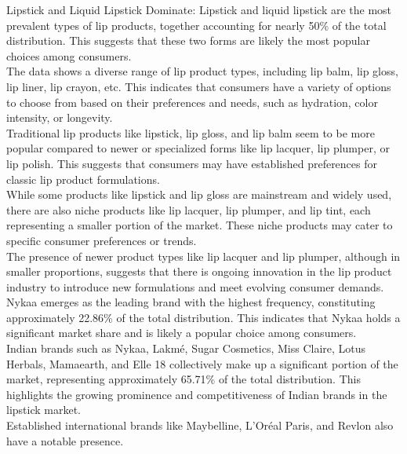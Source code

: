 \documentclass{article}
\begin{document}
\noindent Lipstick and Liquid Lipstick Dominate: Lipstick and liquid lipstick are the most prevalent types of lip products, together accounting for nearly 50\% of the total distribution. This suggests that these two forms are likely the most popular choices among consumers.\\

\noindent The data shows a diverse range of lip product types, including lip balm, lip gloss, lip liner, lip crayon, etc. This indicates that consumers have a variety of options to choose from based on their preferences and needs, such as hydration, color intensity, or longevity.\\

\noindent Traditional lip products like lipstick, lip gloss, and lip balm seem to be more popular compared to newer or specialized forms like lip lacquer, lip plumper, or lip polish. This suggests that consumers may have established preferences for classic lip product formulations.\\

\noindent While some products like lipstick and lip gloss are mainstream and widely used, there are also niche products like lip lacquer, lip plumper, and lip tint, each representing a smaller portion of the market. These niche products may cater to specific consumer preferences or trends.\\

\noindent The presence of newer product types like lip lacquer and lip plumper, although in smaller proportions, suggests that there is ongoing innovation in the lip product industry to introduce new formulations and meet evolving consumer demands.\\

\noindent Nykaa emerges as the leading brand with the highest frequency, constituting approximately 22.86\% of the total distribution. This indicates that Nykaa holds a significant market share and is likely a popular choice among consumers.\\

\noindent Indian brands such as Nykaa, Lakmé, Sugar Cosmetics, Miss Claire, Lotus Herbals, Mamaearth, and Elle 18 collectively make up a significant portion of the market, representing approximately 65.71\% of the total distribution. This highlights the growing prominence and competitiveness of Indian brands in the lipstick market.\\

\noindent Established international brands like Maybelline, L'Oréal Paris, and Revlon also have a notable presence.\\
\end{document}

